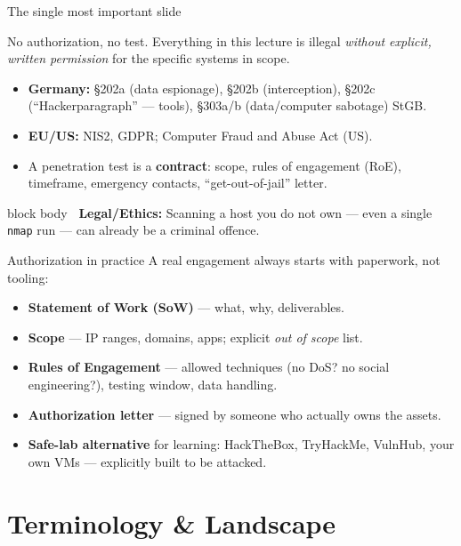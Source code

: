 \documentclass[aspectratio=169,11pt]{beamer}
\newcommand{\legalbox}[1]{%
  \begin{beamercolorbox}[wd=\textwidth,sep=6pt,rounded=true]{block body}%
  \color{warnRed}\textbf{\faExclamationTriangle\ Legal/Ethics:} #1%
  \end{beamercolorbox}}
\begin{document}
\begin{frame}{The single most important slide}
  \begin{alertblock}{No authorization, no test.}
    Everything in this lecture is illegal \emph{without explicit, written
    permission} for the specific systems in scope.
  \end{alertblock}
  \vspace{0.5em}
  \begin{itemize}
    \item \textbf{Germany:} \S202a (data espionage), \S202b (interception),
          \S202c (``Hacker\-paragraph'' --- tools), \S303a/b (data/computer
          sabotage) StGB.
    \item \textbf{EU/US:} NIS2, GDPR; Computer Fraud and Abuse Act (US).
    \item A penetration test is a \textbf{contract}: scope, rules of
          engagement (RoE), timeframe, emergency contacts, ``get-out-of-jail''
          letter.
  \end{itemize}
  \legalbox{Scanning a host you do not own --- even a single \texttt{nmap}
  run --- can already be a criminal offence.}
\end{frame}

\begin{frame}{Authorization in practice}
  A real engagement always starts with paperwork, not tooling:
  \begin{itemize}
    \item \textbf{Statement of Work (SoW)} --- what, why, deliverables.
    \item \textbf{Scope} --- IP ranges, domains, apps; explicit \emph{out of
          scope} list.
    \item \textbf{Rules of Engagement} --- allowed techniques (no DoS? no
          social engineering?), testing window, data handling.
    \item \textbf{Authorization letter} --- signed by someone who actually
          owns the assets.
    \item \textbf{Safe-lab alternative} for learning: HackTheBox, TryHackMe,
          VulnHub, your own VMs --- explicitly built to be attacked.
  \end{itemize}
\end{frame}

\section{Terminology \& Landscape}
\end{document}
